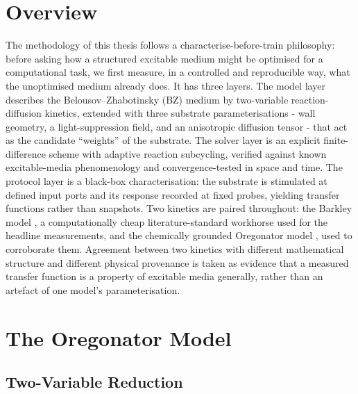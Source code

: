 
\section{Overview}
\label{sec:meth_overview}

The methodology of this thesis follows a characterise-before-train philosophy: before asking how a structured excitable medium might be optimised for a computational task, we first measure, in a controlled and reproducible way, what the unoptimised medium already does.
It has three layers.
The model layer describes the Belousov--Zhabotinsky (BZ) medium by two-variable reaction-diffusion kinetics, extended with three substrate parameterisations - wall geometry, a light-suppression field, and an anisotropic diffusion tensor - that act as the candidate ``weights'' of the substrate.
The solver layer is an explicit finite-difference scheme with adaptive reaction subcycling, verified against known excitable-media phenomenology and convergence-tested in space and time.
The protocol layer is a black-box characterisation: the substrate is stimulated at defined input ports and its response recorded at fixed probes, yielding transfer functions rather than snapshots.
Two kinetics are paired throughout: the Barkley model \cite{barkley1991model}, a computationally cheap literature-standard workhorse used for the headline measurements, and the chemically grounded Oregonator model \cite{field1974oregonator, tyson1980target}, used to corroborate them.
Agreement between two kinetics with different mathematical structure and different physical provenance is taken as evidence that a measured transfer function is a property of excitable media generally, rather than an artefact of one model's parameterisation.

\section{The Oregonator Model}
\label{sec:meth_oregonator}

\subsection{Two-Variable Reduction}
\label{sec:meth_oregonator_2var}

